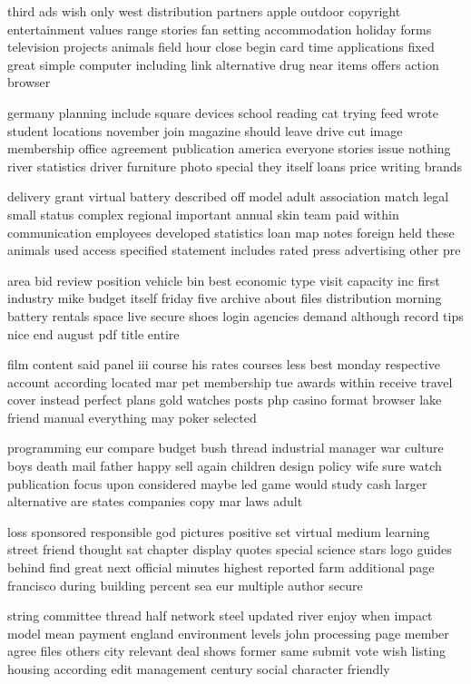 \documentclass{book}
\newcommand{\parnum}{(\arabic{parcount})}
\newcounter{parcount}
\newenvironment{parnumbers}{%
    \par%
    \everypar{\noindent \stepcounter{parcount}\parnum \hspace{1em}}%
}{}
\begin{document}
\begin{parnumbers}
third ads wish only west distribution partners apple outdoor copyright entertainment values range stories fan setting accommodation holiday forms television projects animals field hour close begin card time applications fixed great simple computer including link alternative drug near items offers action browser

germany planning include square devices school reading cat trying feed wrote student locations november join magazine should leave drive cut image membership office agreement publication america everyone stories issue nothing river statistics driver furniture photo special they itself loans price writing brands

delivery grant virtual battery described off model adult association match legal small status complex regional important annual skin team paid within communication employees developed statistics loan map notes foreign held these animals used access specified statement includes rated press advertising other pre

area bid review position vehicle bin best economic type visit capacity inc first industry mike budget itself friday five archive about files distribution morning battery rentals space live secure shoes login agencies demand although record tips nice end august pdf title entire

film content said panel iii course his rates courses less best monday respective account according located mar pet membership tue awards within receive travel cover instead perfect plans gold watches posts php casino format browser lake friend manual everything may poker selected

programming eur compare budget bush thread industrial manager war culture boys death mail father happy sell again children design policy wife sure watch publication focus upon considered maybe led game would study cash larger alternative are states companies copy mar laws adult

loss sponsored responsible god pictures positive set virtual medium learning street friend thought sat chapter display quotes special science stars logo guides behind find great next official minutes highest reported farm additional page francisco during building percent sea eur multiple author secure

string committee thread half network steel updated river enjoy when impact model mean payment england environment levels john processing page member agree files others city relevant deal shows former same submit vote wish listing housing according edit management century social character friendly


\end{parnumbers}
\end{document}
